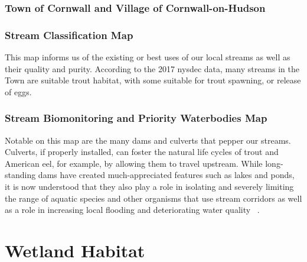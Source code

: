 \subsection*{Town of Cornwall and Village of Cornwall-on-Hudson}
\subsection*{Stream Classification Map}
This map informs us of the existing or best uses of our local streams as well
as their quality and purity. According to the 2017 \gls{nysdec} data, many
streams in the Town are suitable trout habitat, with some suitable for trout
spawning, or release of eggs.

\subsection*{Stream Biomonitoring and Priority Waterbodies Map}
Notable on this map are the many dams and culverts that pepper our streams.
Culverts, if properly installed, can foster the natural life cycles of trout
and American eel, for example, by allowing them to travel upstream. While
long-standing dams have created much-appreciated features such as lakes and
ponds, it is now understood that they also play a role in isolating and
severely limiting the range of aquatic species and other organisms that use
stream corridors as well as a role in increasing local flooding and
deteriorating water quality ~\citep{haeckel2014}.

\chapter{Wetland Habitat}
